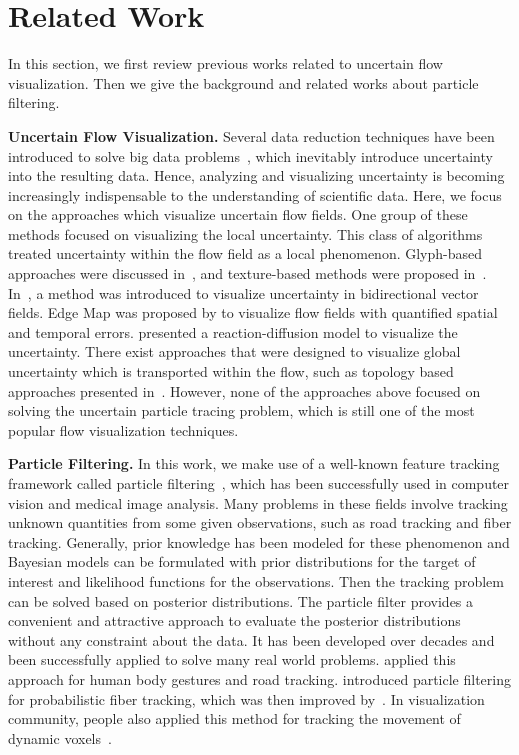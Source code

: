 \section{Related Work}

In this section, we first review previous works related to uncertain flow visualization. Then we give the background and related works about particle filtering.

\textbf{Uncertain Flow Visualization.} Several data reduction techniques have been introduced to solve big data problems~\cite{DBLP:conf/ldav/ThompsonLBBGPP11, conf/ldav/LiuLBP12, 6378985}, which inevitably introduce uncertainty into the resulting data. Hence, analyzing and visualizing uncertainty is becoming increasingly indispensable to the understanding of scientific data. Here, we focus on the approaches which visualize uncertain flow fields. One group of these methods focused on visualizing the local uncertainty. This class of algorithms treated uncertainty within the flow field as a local phenomenon. Glyph-based approaches were discussed in~\cite{citeulike:4002316, conf/visualization/LodhaPSW96}, and texture-based methods were proposed in~\cite{botchen:2006:IVUF, 10.1109/VIS.2005.97}. In~\cite{zuk:2008:UBVF}, a method was introduced to visualize uncertainty in bidirectional vector fields. Edge Map was proposed by \cite{10.1109/TVCG.2011.265} to visualize flow fields with quantified spatial and temporal errors. \cite{conf/visualization/SandersonJK04} presented a reaction-diffusion model to visualize the uncertainty. There exist approaches that were designed to visualize global uncertainty which is transported within the flow, such as topology based approaches presented in~\cite{Otto10a, Otto11a}. However, none of the approaches above focused on solving the uncertain particle tracing problem, which is still one of the most popular flow visualization techniques.

\textbf{Particle Filtering.} In this work, we make use of a well-known feature tracking framework called particle filtering~\cite{doucet2001sequential}, which has been successfully used in computer vision and medical image analysis. Many problems in these fields involve tracking unknown quantities from some given observations, such as road tracking and fiber tracking. Generally, prior knowledge has been modeled for these phenomenon and Bayesian models can be formulated with prior distributions for the target of interest and likelihood functions for the observations. Then the tracking problem can be solved based on posterior distributions. The particle filter provides a convenient and attractive approach to evaluate the posterior distributions without any constraint about the data. It has been developed over decades and been successfully applied to solve many real world problems. \cite{bb69534, journals/pami/GemanJ96} applied this approach for human body gestures and road tracking. \cite{Brun02whitematter, bjornemoMICCAI02} introduced particle filtering for probabilistic fiber tracking, which was then improved by~\cite{journals/mia/PontabryROSKD13, Zhang20095}. In visualization community, people also applied this method for tracking the movement of dynamic voxels~\cite{Zhao2012}.
